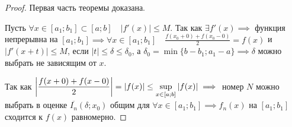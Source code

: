 \begin{proof}
    Первая часть теоремы доказана.

    Пусть $\forall x \in [a_1; b_1] \subset [a; b] \quad |f'(x)| \leq M$. Так
    как $\exists f'(x) \implies$ функция непрерывна на $[a_1; b_1] \implies
    \forall x \in [a_1; b_1] \quad \frac{f(x_0 + 0) + f(x_0 - 0)}{2} = f(x)$
    и $|f'(x + t)| \leq M$, если $|t| \leq \delta \leq \delta_0$, а
    $\delta_0 = \min \{ b - b_1; a_1 - a \} \implies \delta$ можно выбрать
    не зависящим от $x$.

    Так как $\left| \displaystyle\frac{f(x + 0) + f(x - 0)}{2} \right| = |f(x)| \leq 
    \displaystyle\sup_{x \in [a; b]} |f(x)| \implies$ номер $N$ можно выбрать в оценке
    $\overline{I_n}(\delta; x_0)$ общим для $\forall x \in [a_1; b_1] \implies
    f_n(x)$ на $[a_1; b_1]$ сходится к $f(x)$ равномерно.
\end{proof}